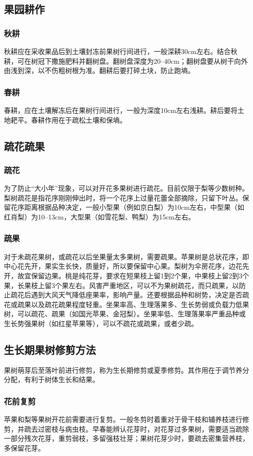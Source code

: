 \documentclass{ctexbook}
\begin{document}
\subsection{果园耕作}
\subsubsection{秋耕}
秋耕应在采收果品后到土壤封冻前果树行间进行，一般深耕30cm左右。结合秋耕，可在树冠下撒施肥料并翻树盘。翻树盘深度为20--40cm；翻树盘要从树干向外由浅到深，以不伤粗树根为准。翻耕后要打碎土块，防止跑墒。
\subsubsection{春耕}
春耕，应在土壤解冻后在果树行间进行，一般为深度10cm左右浅耕。耕后要将土地耙平。春耕作用在于疏松土壤和保墒。
\subsection{疏花疏果}
\subsubsection{疏花}
为了防止“大小年”现象，可以对开花多果树进行疏花。目前仅限于梨等少数树种。梨树疏花是指花序刚刚伸出时，将一个花序上过量花蕾全部摘除，只留下叶丛。保留花序距离根据品种决定，一般小型果（例如京白梨）为10cm左右，中型果（如红肖梨）为10--13cm，大型果（如雪花梨、鸭梨）为15cm左右。
\subsubsection{疏果}
对于未疏花果树，或疏花以后坐果量太多果树，需要疏果。苹果树是总状花序，即中心花先开，果实生长快，质量好，所以要保留中心果。梨树为伞房花序，边花先开，故宜保留边果。桃是纯花芽，要求在短果枝上留1到2个果，中果枝上留2到3个果，长果枝上留3个果左右。风害严重地区，可以不为果树疏花，而只疏果，以防止疏花后遇到大风天气降低座果率，影响产量。还要根据品种和树势，决定是否疏花或疏果以及疏花疏果程度轻重。坐果率高、生理落果多、生长势弱或负载力低果树，可以疏花、疏果（如国光苹果、金冠梨）。坐果率低、生理落果率严重品种或生长势强果树（如红星苹果等），可以不疏花或疏果，或者少疏。
\subsection{生长期果树修剪方法}
果树萌芽后至落叶前进行修剪，称为生长期修剪或夏季修剪。其作用在于调节养分分配，有利于树体生长和结果。
\subsubsection{花前复剪}
苹果和梨等果树开花前需要进行复剪。一般冬剪时着重对于骨干枝和辅养枝进行修剪，并疏去过密枝与病虫枝。早春能辨认花芽时，对花芽过多果树，需要适当疏除一部分残次花芽，重剪弱枝，多留强枝壮芽；果树花芽少时，要疏去密集营养枝，多保留花芽。
\end{document}
